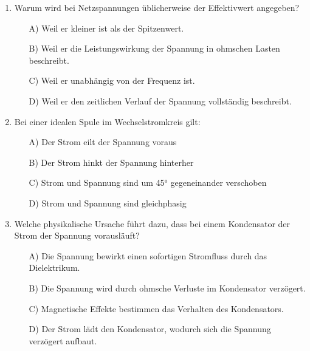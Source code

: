 \documentclass[a4paper,12pt]{article}
\newif\ifshowsolutions
\begin{document}
\begin{enumerate}[label=\textbf{\arabic*.}, leftmargin=*, itemsep=8pt]
  \item Warum wird bei Netzspannungen üblicherweise der Effektivwert angegeben?
    \begin{itemize}[label=$\square$]
      \item[A)] Weil er kleiner ist als der Spitzenwert.
      \item[B)] Weil er die Leistungswirkung der Spannung in ohmschen Lasten beschreibt.
      \item[C)] Weil er unabhängig von der Frequenz ist.
      \item[D)] Weil er den zeitlichen Verlauf der Spannung vollständig beschreibt.
    \end{itemize}

\ifshowsolutions
Lösung: B
\fi

  \item Bei einer idealen Spule im Wechselstromkreis gilt:
    \begin{itemize}[label=$\square$]
      \item[A)] Der Strom eilt der Spannung voraus
      \item[B)] Der Strom hinkt der Spannung hinterher
      \item[C)] Strom und Spannung sind um 45° gegeneinander verschoben
      \item[D)] Strom und Spannung sind gleichphasig
    \end{itemize}

\ifshowsolutions
Lösung: B
\fi

  \item Welche physikalische Ursache führt dazu, dass bei einem Kondensator der Strom der Spannung vorausläuft?
    \begin{itemize}[label=$\square$]
      \item[A)] Die Spannung bewirkt einen sofortigen Stromfluss durch das Dielektrikum.
      \item[B)] Die Spannung wird durch ohmsche Verluste im Kondensator verzögert.
      \item[C)] Magnetische Effekte bestimmen das Verhalten des Kondensators.
      \item[D)] Der Strom lädt den Kondensator, wodurch sich die Spannung verzögert aufbaut.
    \end{itemize}

\ifshowsolutions
Lösung: D
\fi


\end{enumerate}
\end{document}
